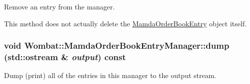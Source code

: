 Remove an entry from the manager. 

This method does not actually delete the \hyperlink{classWombat_1_1MamdaOrderBookEntry}{Mamda\-Order\-Book\-Entry} object itself. \hypertarget{classWombat_1_1MamdaOrderBookEntryManager_58202cded81c490e26550eafc7f81db7}{
\subsubsection[dump]{\setlength{\rightskip}{0pt plus 5cm}void Wombat::Mamda\-Order\-Book\-Entry\-Manager::dump (std::ostream \& {\em output}) const}}
\label{classWombat_1_1MamdaOrderBookEntryManager_58202cded81c490e26550eafc7f81db7}


Dump (print) all of the entries in this manager to the output stream. 

